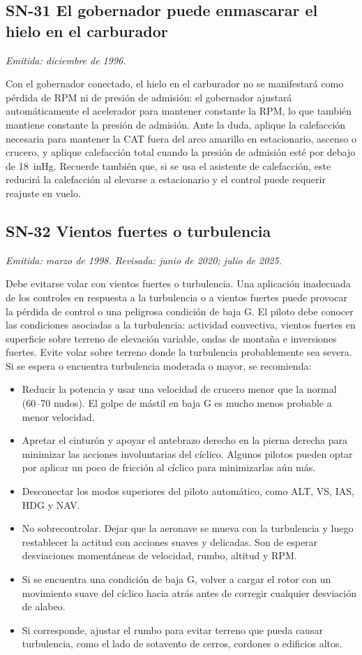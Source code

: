 \subsection*{SN-31 \quad El gobernador puede enmascarar el hielo en el carburador}
{\small\textit{Emitida: diciembre de 1996.}}

Con el gobernador conectado, el hielo en el carburador no se manifestará como pérdida de RPM ni de presión de admisión: el gobernador ajustará automáticamente el acelerador para mantener constante la RPM, lo que también mantiene constante la presión de admisión. Ante la duda, aplique la calefacción necesaria para mantener la CAT fuera del arco amarillo en estacionario, ascenso o crucero, y aplique calefacción total cuando la presión de admisión esté por debajo de 18~inHg. Recuerde también que, si se usa el asistente de calefacción, este reducirá la calefacción al elevarse a estacionario y el control puede requerir reajuste en vuelo.

\subsection*{SN-32 \quad Vientos fuertes o turbulencia}
{\small\textit{Emitida: marzo de 1998. Revisada: junio de 2020; julio de 2025.}}

Debe evitarse volar con vientos fuertes o turbulencia. Una aplicación inadecuada de los controles en respuesta a la turbulencia o a vientos fuertes puede provocar la pérdida de control o una peligrosa condición de baja G. El piloto debe conocer las condiciones asociadas a la turbulencia: actividad convectiva, vientos fuertes en superficie sobre terreno de elevación variable, ondas de montaña e inversiones fuertes. Evite volar sobre terreno donde la turbulencia probablemente sea severa. Si se espera o encuentra turbulencia moderada o mayor, se recomienda:

\begin{itemize}
\item Reducir la potencia y usar una velocidad de crucero menor que la normal (60--70 nudos). El golpe de mástil en baja G es mucho menos probable a menor velocidad.
\item Apretar el cinturón y apoyar el antebrazo derecho en la pierna derecha para minimizar las acciones involuntarias del cíclico. Algunos pilotos pueden optar por aplicar un poco de fricción al cíclico para minimizarlas aún más.
\item Desconectar los modos superiores del piloto automático, como ALT, VS, IAS, HDG y NAV.
\item No sobrecontrolar. Dejar que la aeronave se mueva con la turbulencia y luego restablecer la actitud con acciones suaves y delicadas. Son de esperar desviaciones momentáneas de velocidad, rumbo, altitud y RPM.
\item Si se encuentra una condición de baja G, volver a cargar el rotor con un movimiento suave del cíclico hacia atrás antes de corregir cualquier desviación de alabeo.
\item Si corresponde, ajustar el rumbo para evitar terreno que pueda causar turbulencia, como el lado de sotavento de cerros, cordones o edificios altos.
\end{itemize}

